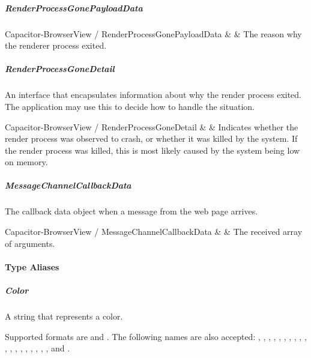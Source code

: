 
\newpage

\subparagraph{RenderProcessGonePayloadData}

\begin{interfacedesc}{Capacitor-BrowserView / RenderProcessGonePayloadData}
   &  & The reason why the renderer process exited. \\ \hline
\end{interfacedesc}


\subparagraph{RenderProcessGoneDetail}

An interface that encapsulates information about why the render process exited.
The application may use this to decide how to handle the situation.

\begin{interfacedesc}{Capacitor-BrowserView / RenderProcessGoneDetail}
   &  & Indicates whether the render process was observed to crash, or whether it was killed by the system. If the render process was killed, this is most likely caused by the system being low on memory. \\ \hline
\end{interfacedesc}


\subparagraph{MessageChannelCallbackData}

The callback data object when a message from the web page arrives.

\begin{interfacedesc}{Capacitor-BrowserView / MessageChannelCallbackData}
   &  & The received array of arguments. \\ \hline
\end{interfacedesc}


\newpage

\paragraph{Type Aliases}


\subparagraph{Color}

A string that represents a color.

Supported formats are  and .
The following names are also accepted: , , , , , , , , , , , , , , , , , , , and .

